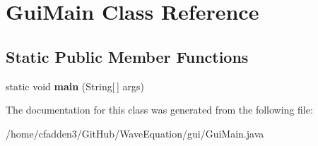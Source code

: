 \section{Gui\+Main Class Reference}
\label{class_gui_main}
\subsection*{Static Public Member Functions}
\begin{DoxyCompactItemize}
\item 
static void {\bfseries main} (String[$\,$] args)\label{class_gui_main_a78779debd17ffbb0a8ded52d503a08a0}

\end{DoxyCompactItemize}


The documentation for this class was generated from the following file\+:\begin{DoxyCompactItemize}
\item 
/home/cfadden3/\+Git\+Hub/\+Wave\+Equation/gui/Gui\+Main.\+java\end{DoxyCompactItemize}
